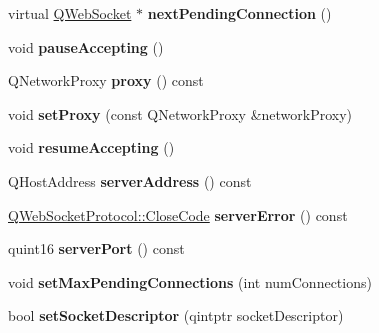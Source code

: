 \begin{DoxyCompactItemize}
virtual \mbox{\hyperlink{class_q_web_socket}{Q\+Web\+Socket}} $\ast$ {\bfseries next\+Pending\+Connection} ()
\item 
\mbox{\label{class_q_web_socket_server_private_a36555f4c5cdba0c44939f770d61feb52}} 
void {\bfseries pause\+Accepting} ()
\item 
\mbox{\label{class_q_web_socket_server_private_a17d78616b4b231b02f8302d0d59b9967}} 
Q\+Network\+Proxy {\bfseries proxy} () const
\item 
\mbox{\label{class_q_web_socket_server_private_a0515302b166786a64d4af0933bbbd237}} 
void {\bfseries set\+Proxy} (const Q\+Network\+Proxy \&network\+Proxy)
\item 
\mbox{\label{class_q_web_socket_server_private_a2416bb482098b30b3f4ea281cad98a88}} 
void {\bfseries resume\+Accepting} ()
\item 
\mbox{\label{class_q_web_socket_server_private_a15f84c881213ae643f1d2e6e92fb2095}} 
Q\+Host\+Address {\bfseries server\+Address} () const
\item 
\mbox{\label{class_q_web_socket_server_private_a28287695825a936dc420e9707f43b315}} 
\mbox{\hyperlink{namespace_q_web_socket_protocol_a9f236676f594451d8d723f260b71028c}{Q\+Web\+Socket\+Protocol\+::\+Close\+Code}} {\bfseries server\+Error} () const
\item 
\mbox{\label{class_q_web_socket_server_private_aa95e43ffcb3c3d37f54d648a180ae558}} 
quint16 {\bfseries server\+Port} () const
\item 
\mbox{\label{class_q_web_socket_server_private_a3d4343eb938ca0f87f4bac29804f0217}} 
void {\bfseries set\+Max\+Pending\+Connections} (int num\+Connections)
\item 
\mbox{\label{class_q_web_socket_server_private_a79cb90f7b7dc478be6951a993d6fe921}} 
bool {\bfseries set\+Socket\+Descriptor} (qintptr socket\+Descriptor)

\end{DoxyCompactItemize}
